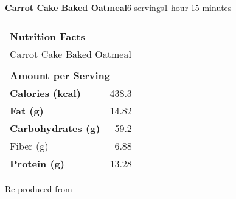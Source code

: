 \documentclass[../recipe-collections/cooking.tex]{subfiles}
\begin{document}
\begin{recipe}{\textbf{Carrot Cake Baked Oatmeal}}{6 servings}{1 hour 15 minutes}
  \bigskip
  \centering
  \begin{tabular}{|lr|}
    \hline
                                        &                                       \\
    \multicolumn{2}{|l|}{\huge{\textbf{\textrm{Nutrition Facts}}}}              \\
    \multicolumn{2}{|l|}{\textrm{Carrot Cake Baked Oatmeal}}                               \\ 
                                        &                                       \\
    \multicolumn{2}{|l|}{\footnotesize{\textbf{\textrm{Amount per Serving}}}}   \\ \hline
    \textbf{\textrm{Calories (kcal)}}   & \textrm{438.3}                          \\ \hline
    \textbf{\textrm{Fat (g)}}           & \textrm{14.82}                           \\ \hline
    \textbf{\textrm{Carbohydrates (g)}} & \textrm{59.2}                            \\ \hline
    \hspace{2mm} \textrm{Fiber (g)}     & \textrm{6.88}                            \\ \hline
    \textbf{\textrm{Protein (g)}} & \textrm{13.28}                            \\ \hline
  \end{tabular}

  \freeform{}\hrulefill{}
  

\end{recipe}

Re-produced from  
\autocite{BudgetBytes_CarrotCake_2019}
\end{document}
